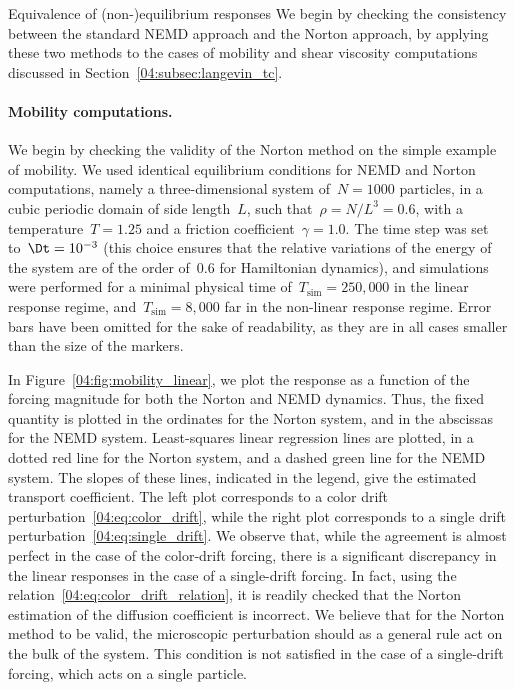     
    \begin{subsection}{Equivalence of (non-)equilibrium responses}\label{04:subsec:numerical_consistency}
    We begin by checking the consistency between the standard NEMD approach and the Norton approach, by applying these two methods to the cases of mobility and shear viscosity computations discussed in Section~\ref{04:subsec:langevin_tc}.
    \paragraph{Mobility computations.}
    We begin by checking the validity of the Norton method on the simple example of mobility. We used identical equilibrium conditions for NEMD and Norton computations, namely a three-dimensional system of~$N=1000$ particles, in a cubic periodic domain of side length~$L$, such that~$\rho=N/L^3 = 0.6$, with a temperature~$T = 1.25$ and a friction coefficient~$\gamma = 1.0$. The time step was set to~$\Dt = 10^{-3}$ (this choice ensures that the relative variations of the energy of the system are of the order of~0.6 for Hamiltonian dynamics), and simulations were performed for a minimal physical time of~$T_{\mathrm{sim}} = 250,000$ in the linear response regime, and~$T_{\mathrm{sim}} = 8,000$ far in the non-linear response regime. Error bars have been omitted for the sake of readability, as they are in all cases smaller than the size of the markers.

    In Figure~\ref{04:fig:mobility_linear}, we plot the response as a function of the forcing magnitude for both the Norton and NEMD dynamics. Thus, the fixed quantity is plotted in the ordinates for the Norton system, and in the abscissas for the NEMD system. Least-squares linear regression lines are plotted, in a dotted red line for the Norton system, and a dashed green line for the NEMD system. The slopes of these lines, indicated in the legend, give the estimated transport coefficient. The left plot corresponds to a color drift perturbation~\eqref{04:eq:color_drift}, while the right plot corresponds to a single drift perturbation~\eqref{04:eq:single_drift}. We observe that, while the agreement is almost perfect in the case of the color-drift forcing, there is a significant discrepancy in the linear responses in the case of a single-drift forcing. In fact, using the relation~\eqref{04:eq:color_drift_relation}, it is readily checked that the Norton estimation of the diffusion coefficient is incorrect. We believe that for the Norton method to be valid, the microscopic perturbation should as a general rule act on the bulk of the system. This condition is not satisfied in the case of a single-drift forcing, which acts on a single particle.
    

\end{subsection}
